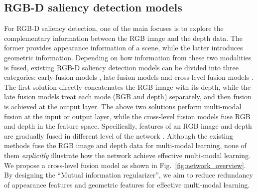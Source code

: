 \documentclass[10pt,twocolumn,letterpaper]{article}
\begin{document}
\subsection{RGB-D saliency detection models}
For RGB-D saliency detection, one of the main focuses is to explore the complementary information between the RGB image and the depth data. The former provides appearance information of a scene, while the latter  introduces geometric information. Depending on how information from these two modalities is fused, existing RGB-D saliency detection models can be divided into three categories: early-fusion models \cite{qu2017rgbd,jing2020uc}, late-fusion models \cite{wang2019adaptive,han2017cnns,A2dele_cvpr2020} and cross-level fusion models \cite{dmra_iccv19,chen2018progressively,chen2019multi,chen2019three,zhao2019Contrast,ssf_rgbd,self_attention_rgbd,fan2020bbs,ji2020accurate,HDFNet-ECCV2020,zhang2020bilateral,cmms_rgbd,Li_2020_CMWNet}. 
The first solution directly concatenates the RGB image with its depth,
while
the late fusion models treat each mode (RGB and depth) separately, and then fusion is achieved at the output layer.
The above two solutions perform multi-modal fusion at the input or output layer, while the cross-level fusion models fuse RGB and depth in the feature space. Specifically, features of an RGB image and depth are gradually fused in different level of the network
\cite{HDFNet-ECCV2020,Li_2020_CMWNet,fan2020bbs,cmms_rgbd,Luo2020CascadeGN,chen2020eccv,ATSA,self_attention_rgbd,ssf_rgbd}.
Although the existing methods fuse the RGB image and depth data for multi-modal learning,
none of them \textit{explicitly} illustrate
how the network achieve effective multi-modal learning.
We propose a cross-level fusion model as shown in Fig.~\ref{fig:network_overview}. By designing the \enquote{Mutual information regularizer}, we aim to reduce redundancy of appearance features and geometric features for effective multi-modal learning.
\end{document}
